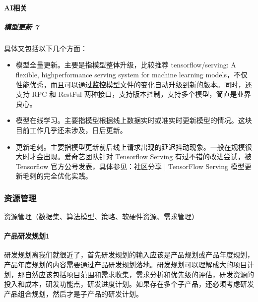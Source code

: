 \documentclass[letterpaper,11pt,english]{sphinxmanual}
\begin{document}
\paragraph{AI相关}
\label{\detokenize{chapter_knowledge/upgrade_manage:ai}}

\subparagraph{模型更新 7\sphinxfootnotemark[589]}
\label{\detokenize{chapter_knowledge/upgrade_manage:id21}}%
\begin{footnotetext}[589]\sphinxAtStartFootnote
{}
%
\end{footnotetext}\ignorespaces 
具体又包括以下几个方面：
\begin{itemize}
\item {} 
模型全量更新。主要是指模型整体升级，比较推荐 tensorflow/serving: A
flexible, high\sphinxhyphen{}performance serving system for machine learning
models，不仅性能优秀，而且可以通过监控模型文件的变化自动升级到新的版本。同时，还支持
RPC 和 RestFul 两种接口，支持版本控制，支持多个模型，简直是业界良心。

\item {} 
模型在线学习。主要指模型根据线上数据实时或准实时更新模型的情况。这块目前工作几乎还未涉及，日后更新。

\item {} 
更新毛刺。主要指模型更新前后线上请求出现的延迟抖动现象。一般在规模很大时才会出现。爱奇艺团队针对
Tensorflow Serving 有过不错的改进尝试，被 Tensorflow
官方公号发表，具体参见：社区分享 | TensorFlow Serving
模型更新毛刺的完全优化实践。

\end{itemize}


\subsubsection{资源管理}
\label{\detokenize{chapter_knowledge/resource_manage:id1}}\label{\detokenize{chapter_knowledge/resource_manage::doc}}
资源管理（数据集、算法模型、策略、软硬件资源、需求管理）


\paragraph{产品研发规划1\sphinxfootnotemark[590]}
\label{\detokenize{chapter_knowledge/resource_manage:id2}}%
\begin{footnotetext}[590]\sphinxAtStartFootnote
{}
%
\end{footnotetext}\ignorespaces 
研发规划离我们就很近了，首先研发规划的输入应该是产品规划或产品年度规划，产品年度规划的内容需要通过产品研发规划落地。研发规划可以理解成大的项目计划，那自然应该包括项目范围和需求收集，需求分析和优先级的评估，研发资源的投入和成本，研发功能点，研发进度计划。如果存在多个子产品，还必须考虑研发产品组合规划，然后才是子产品的研发计划。
\end{document}
